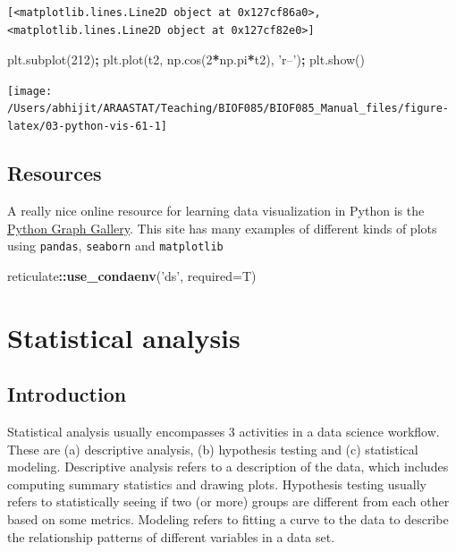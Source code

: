 \documentclass[
  letterpaper,
]{scrbook}
\newenvironment{Shaded}{\begin{snugshade}}{\end{snugshade}}
\newcommand{\DataTypeTok}[1]{\textcolor[rgb]{0.13,0.29,0.53}{#1}}
\newcommand{\DecValTok}[1]{\textcolor[rgb]{0.00,0.00,0.81}{#1}}
\newcommand{\KeywordTok}[1]{\textcolor[rgb]{0.13,0.29,0.53}{\textbf{#1}}}
\newcommand{\NormalTok}[1]{#1}
\newcommand{\OperatorTok}[1]{\textcolor[rgb]{0.81,0.36,0.00}{\textbf{#1}}}
\newcommand{\StringTok}[1]{\textcolor[rgb]{0.31,0.60,0.02}{#1}}
\begin{document}
\begin{verbatim}
[<matplotlib.lines.Line2D object at 0x127cf86a0>, <matplotlib.lines.Line2D object at 0x127cf82e0>]
\end{verbatim}

\begin{Shaded}
\begin{Highlighting}[]
\NormalTok{plt.subplot(}\DecValTok{212}\NormalTok{)}\OperatorTok{;}
\NormalTok{plt.plot(t2, np.cos(}\DecValTok{2}\OperatorTok{*}\NormalTok{np.pi}\OperatorTok{*}\NormalTok{t2), }\StringTok{'r--'}\NormalTok{)}\OperatorTok{;}
\NormalTok{plt.show()}
\end{Highlighting}
\end{Shaded}

\begin{center}\texttt{[image: /Users/abhijit/ARAASTAT/Teaching/BIOF085/BIOF085\_Manual\_files/figure-latex/03-python-vis-61-1]} \end{center}

\hypertarget{resources}{%
\section{Resources}\label{resources}}

A really nice online resource for learning data visualization in Python is the \href{https://python-graph-gallery.com/}{Python Graph Gallery}. This site has many examples of different kinds of plots using \texttt{pandas}, \texttt{seaborn} and \texttt{matplotlib}

\begin{Shaded}
\begin{Highlighting}[]
\NormalTok{reticulate}\OperatorTok{::}\KeywordTok{use_condaenv}\NormalTok{(}\StringTok{'ds'}\NormalTok{, }\DataTypeTok{required=}\NormalTok{T)}
\end{Highlighting}
\end{Shaded}

\hypertarget{statistical-analysis}{%
\chapter{Statistical analysis}\label{statistical-analysis}}

\hypertarget{introduction-3}{%
\section{Introduction}\label{introduction-3}}

Statistical analysis usually encompasses 3 activities in a data science workflow. These are (a) descriptive analysis, (b) hypothesis testing and (c) statistical modeling. Descriptive analysis refers to a description of the data, which includes computing summary statistics and drawing plots. Hypothesis testing usually refers to statistically seeing if two (or more) groups are different from each other based on some metrics. Modeling refers to fitting a curve to the data to describe the relationship patterns of different variables in a data set.
\end{document}
